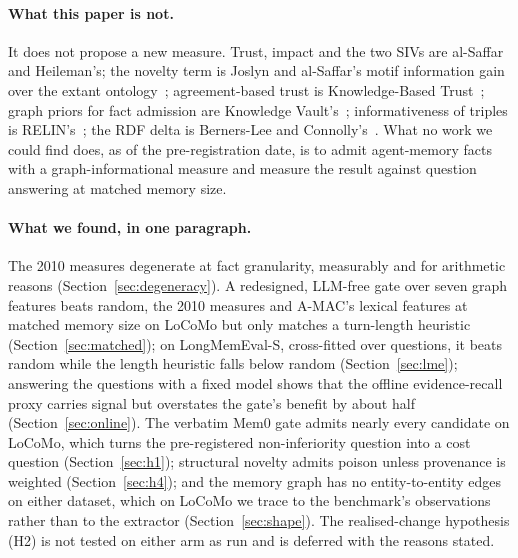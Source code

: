 \documentclass{ceurart}
\begin{document}
\paragraph{What this paper is not.} It does not propose a new measure. Trust, impact and the two SIVs are al-Saffar and Heileman's; the novelty term is Joslyn and al-Saffar's motif information gain over the extant ontology~\cite{joslyn2011motifs,alsaffar2011extant}; agreement-based trust is Knowledge-Based Trust~\cite{dong2015kbt}; graph priors for fact admission are Knowledge Vault's~\cite{dong2014kv}; informativeness of triples is RELIN's~\cite{cheng2011relin}; the RDF delta is Berners-Lee and Connolly's~\cite{bernerslee2001delta}. What no work we could find does, as of the pre-registration date, is to admit agent-memory facts with a graph-informational measure and measure the result against question answering at matched memory size.

\paragraph{What we found, in one paragraph.} The 2010 measures degenerate at fact granularity, measurably and for arithmetic reasons (Section~\ref{sec:degeneracy}). A redesigned, LLM-free gate over seven graph features beats random, the 2010 measures and A-MAC's lexical features at matched memory size on LoCoMo but only matches a turn-length heuristic (Section~\ref{sec:matched}); on LongMemEval-S, cross-fitted over questions, it beats random while the length heuristic falls below random (Section~\ref{sec:lme}); answering the questions with a fixed model shows that the offline evidence-recall proxy carries signal but overstates the gate's benefit by about half (Section~\ref{sec:online}). The verbatim Mem0 gate admits nearly every candidate on LoCoMo, which turns the pre-registered non-inferiority question into a cost question (Section~\ref{sec:h1}); structural novelty admits poison unless provenance is weighted (Section~\ref{sec:h4}); and the memory graph has no entity-to-entity edges on either dataset, which on LoCoMo we trace to the benchmark's observations rather than to the extractor (Section~\ref{sec:shape}). The realised-change hypothesis (H2) is not tested on either arm as run and is deferred with the reasons stated.
\end{document}
